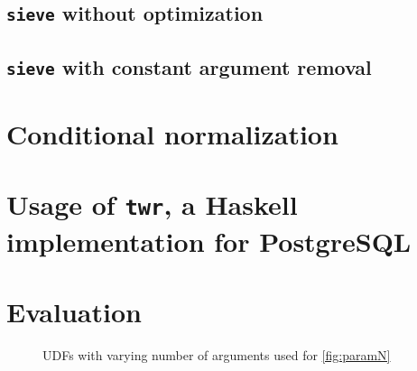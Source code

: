 \subsection{\texttt{sieve} without optimization}
\subsection{\texttt{sieve} with constant argument removal}
\section{Conditional normalization}
\section{Usage of \texttt{twr}, a Haskell implementation for PostgreSQL}
\label{sql:conditionals}
\section{Evaluation}
\begin{figure}
    \centering
    \caption{UDFs with varying number of arguments used for \autoref{fig:paramN}}
    \label{udfs:paramN}
\end{figure}
